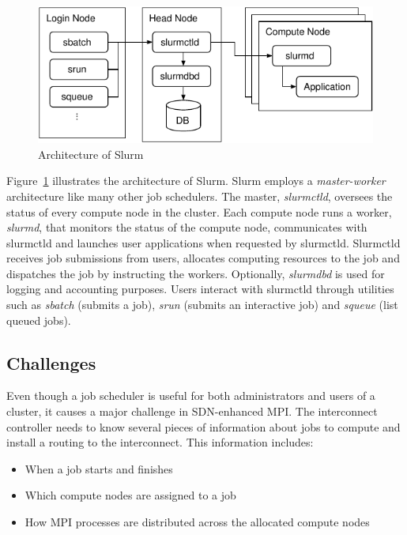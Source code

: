 \documentclass[graybox]{svmult}
\begin{document}
\begin{figure}
    \centering
    \includegraphics{slurm}
    \caption{Architecture of Slurm}%
    \label{kt:fig:slurm}
\end{figure}

Figure~\ref{kt:fig:slurm} illustrates the architecture of Slurm. Slurm employs
a \textit{master-worker} architecture like many other job schedulers. The
master, \textit{slurmctld}, oversees the status of every compute node in the
cluster. Each compute node runs a worker, \textit{slurmd}, that monitors the
status of the compute node, communicates with slurmctld and launches user
applications when requested by slurmctld. Slurmctld receives job submissions
from users, allocates computing resources to the job and dispatches the job by
instructing the workers. Optionally, \textit{slurmdbd} is used for logging and
accounting purposes. Users interact with slurmctld through utilities such as
\textit{sbatch} (submits a job), \textit{srun} (submits an interactive job)
and \textit{squeue} (list queued jobs).

\subsection{Challenges}

Even though a job scheduler is useful for both administrators and users of a
cluster, it causes a major challenge in SDN-enhanced MPI\@. The interconnect
controller needs to know several pieces of information about jobs to compute
and install a routing to the interconnect. This information includes:

\begin{itemize}
    \item When a job starts and finishes
    \item Which compute nodes are assigned to a job
    \item How MPI processes are distributed across the allocated compute nodes
\end{itemize}
\end{document}
